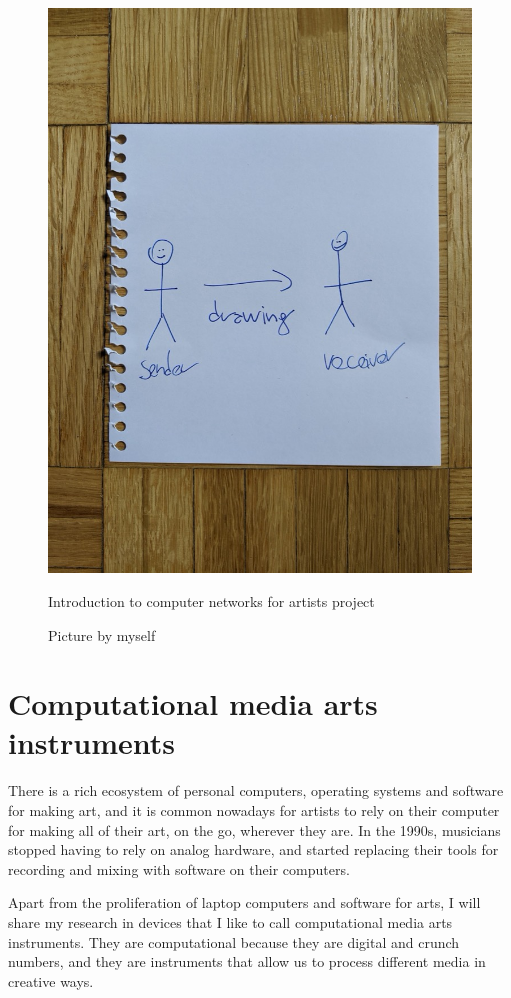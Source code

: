 \begin{figure}[ht]
  \centering
  \includegraphics[width=0.75\linewidth,height=0.35\textheight,keepaspectratio]{images/intro-to-computer-networks-for-artists.jpg}
  \caption{Introduction to computer networks for artists project}
  \caption*{Picture by myself}
  \label{fig:intro-to-computer-networks-for-artists}
\end{figure}

\section{Computational media arts instruments}

There is a rich ecosystem of personal computers, operating systems and software for making art, and it is common nowadays for artists to rely on their computer for making all of their art, on the go, wherever they are. In the 1990s, musicians stopped having to rely on analog hardware, and started replacing their tools for recording and mixing with software on their computers.

Apart from the proliferation of laptop computers and software for arts, I will share my research in devices that I like to call computational media arts instruments. They are computational because they are digital and crunch numbers, and they are instruments that allow us to process different media in creative ways.

